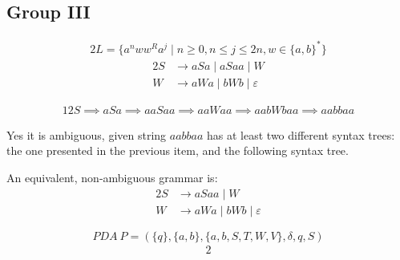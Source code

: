 \documentclass[docid=2018/19]{tcom_exam}
\begin{document}
{\subsection{Group III}
\begin{alignat*}{2}
	L=\{a^n w w^R a^j \mid n \geq 0, n \leq j \leq 2n, w \in \{a,b\}^*\}
\end{alignat*}
\begin{alignat*}{2}
	S &\rightarrow aSa\mid aSaa\mid W\\
	W &\rightarrow aWa\mid bWb\mid \varepsilon
\end{alignat*}
\begin{minipage}[c]{0.68\textwidth}
	\begin{alignat*}{12}
		S \implies aSa \implies aaSaa \implies aaWaa \implies aabWbaa \implies aabbaa
	\end{alignat*}
\end{minipage}
\begin{minipage}[c]{0.3\textwidth}
	\begin{center}
	\end{center}
\end{minipage}
Yes it is ambiguous, given string $aabbaa$ has at least two different syntax trees: the one presented in the previous item, and the following syntax tree.
\begin{center}
\end{center}
An equivalent, non-ambiguous grammar is:
\begin{alignat*}{2}
	S &\rightarrow aSaa\mid W\\
	W &\rightarrow aWa\mid bWb\mid \varepsilon
\end{alignat*}
\begin{minipage}[c]{0.49\textwidth}
	\begin{equation*}
		PDA~P=(\{q\},\{a,b\},\{a,b,S,T,W,V\},\delta,q,S)
	\end{equation*}
	\begin{alignat*}{2}

\end{alignat*}
\end{minipage}}
\end{document}
